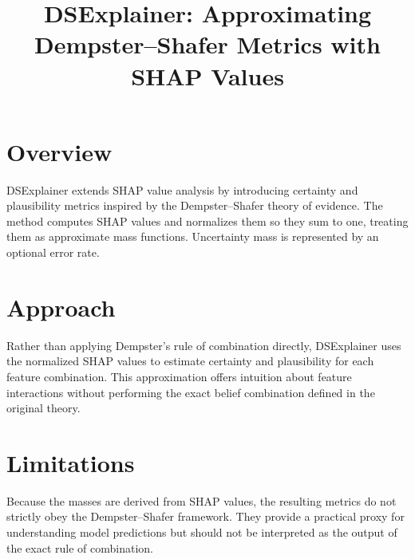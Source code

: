 \documentclass{article}
\begin{document}
\title{DSExplainer: Approximating Dempster--Shafer Metrics with SHAP Values}
\author{}
\date{}
\maketitle

\section{Overview}
DSExplainer extends SHAP value analysis by introducing certainty and plausibility metrics inspired by the Dempster--Shafer theory of evidence. The method computes SHAP values and normalizes them so they sum to one, treating them as approximate mass functions. Uncertainty mass is represented by an optional error rate.

\section{Approach}
Rather than applying Dempster's rule of combination directly, DSExplainer uses the normalized SHAP values to estimate certainty and plausibility for each feature combination. This approximation offers intuition about feature interactions without performing the exact belief combination defined in the original theory.

\section{Limitations}
Because the masses are derived from SHAP values, the resulting metrics do not strictly obey the Dempster--Shafer framework. They provide a practical proxy for understanding model predictions but should not be interpreted as the output of the exact rule of combination.
\end{document}

